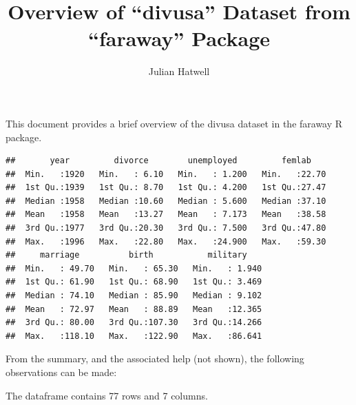 \documentclass{article}\usepackage[]{graphicx}\usepackage[]{color}
\makeatletter
\newenvironment{kframe}{%
 \def\at@end@of@kframe{}%
 \ifinner\ifhmode%
  \def\at@end@of@kframe{\end{minipage}}%
  \begin{minipage}{\columnwidth}%
 \fi\fi%
 \def\FrameCommand##1{\hskip\@totalleftmargin \hskip-\fboxsep
 \colorbox{shadecolor}{##1}\hskip-\fboxsep
     \hskip-\linewidth \hskip-\@totalleftmargin \hskip\columnwidth}%
 \MakeFramed {\advance\hsize-\width
   \@totalleftmargin\z@ \linewidth\hsize
   \@setminipage}}%
 {\par\unskip\endMakeFramed%
 \at@end@of@kframe}
\newenvironment{knitrout}{}{} %
\makeatother
\begin{document}
\title{Overview of 
``divusa'' 
Dataset from 
``faraway''
Package}
\author{Julian Hatwell}
\maketitle

This document provides a brief overview of the
divusa dataset in the 
faraway R package.

\begin{knitrout}
\color{fgcolor}\begin{kframe}
\begin{verbatim}
##       year         divorce        unemployed         femlab     
##  Min.   :1920   Min.   : 6.10   Min.   : 1.200   Min.   :22.70  
##  1st Qu.:1939   1st Qu.: 8.70   1st Qu.: 4.200   1st Qu.:27.47  
##  Median :1958   Median :10.60   Median : 5.600   Median :37.10  
##  Mean   :1958   Mean   :13.27   Mean   : 7.173   Mean   :38.58  
##  3rd Qu.:1977   3rd Qu.:20.30   3rd Qu.: 7.500   3rd Qu.:47.80  
##  Max.   :1996   Max.   :22.80   Max.   :24.900   Max.   :59.30  
##     marriage          birth           military     
##  Min.   : 49.70   Min.   : 65.30   Min.   : 1.940  
##  1st Qu.: 61.90   1st Qu.: 68.90   1st Qu.: 3.469  
##  Median : 74.10   Median : 85.90   Median : 9.102  
##  Mean   : 72.97   Mean   : 88.89   Mean   :12.365  
##  3rd Qu.: 80.00   3rd Qu.:107.30   3rd Qu.:14.266  
##  Max.   :118.10   Max.   :122.90   Max.   :86.641
\end{verbatim}
\end{kframe}
\end{knitrout}

From the summary, and the associated help (not shown), the following observations can be made:
\newline

The dataframe contains 
77 
rows and 
7
columns. 

\newpage
\end{document}
